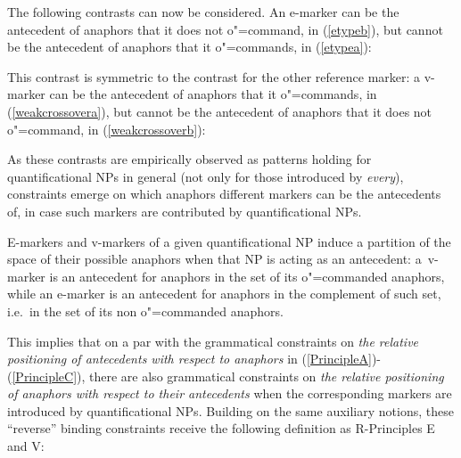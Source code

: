 \documentclass[output=paper
,modfonts
,nonflat]{langsci/langscibook}
\begin{document}
The following contrasts can now be considered. An e-marker can be the
antecedent of anaphors that it does not o"=command, in (\ref{etypeb}), but
cannot be the antecedent of anaphors that it o"=commands, in (\ref{etypea}):

\begin{exe}
\ex\label{etype}
\begin{xlist}
\label{etypea}
\label{etypeb}
\end{xlist}
\end{exe}

This contrast is symmetric to the contrast for the other reference marker: a v-marker 
can be the antecedent of anaphors that it o"=commands, in (\ref{weakcrossovera}), but
cannot be the antecedent of anaphors that it 
does not o"=command, in (\ref{weakcrossoverb}):

\begin{exe}
\ex\label{weakcrossover}
\begin{xlist}
\label{weakcrossovera}
\label{weakcrossoverb}
\end{xlist}
\end{exe}

As these contrasts are empirically observed as patterns holding for quantificational NPs
in general (not only for those introduced by {\em every}), 
constraints emerge on which anaphors different markers can be the antecedents 
of, in case such markers are contributed by quantificational NPs.

E-markers and v-markers of a given quantificational NP induce a partition of the
space of their possible anaphors when that NP is acting as an
antecedent:  a~\mbox{v-marker}
is an antecedent for anaphors in the set of its o"=commanded anaphors, while  
an e-marker is an antecedent for anaphors in the complement of such set, i.e.\ in 
the set of its non o"=commanded anaphors.

This implies that on a par with the grammatical constraints on {\em the relative
positioning of antecedents with respect to anaphors} in (\ref{PrincipleA})-(\ref{PrincipleC}), 
there are also grammatical constraints on {\em the relative positioning 
of anaphors with respect to their antecedents} when
the corresponding markers are introduced by quantificational NPs. 
Building on the same auxiliary notions, these ``reverse'' binding
constraints receive the following definition as R-Principles E and V:
\end{document}
